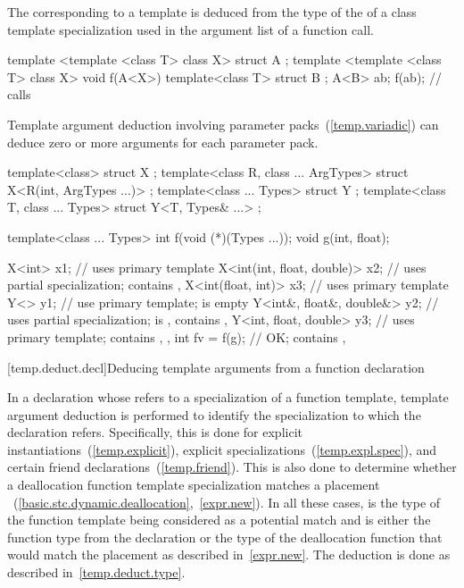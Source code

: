 \pnum
The
corresponding to a template
is deduced from the type of the
of a class template specialization used in the argument list of a function call.
\enterexample

\begin{codeblock}
template <template <class T> class X> struct A { };
template <template <class T> class X> void f(A<X>) { }
template<class T> struct B { };
A<B> ab;
f(ab);              // calls 
\end{codeblock}
\exitexample

\pnum
\enternote Template argument deduction involving parameter
packs~(\ref{temp.variadic}) can deduce zero or more arguments for
each parameter pack. \exitnote\enterexample

\begin{codeblock}
template<class> struct X { };
template<class R, class ... ArgTypes> struct X<R(int, ArgTypes ...)> { };
template<class ... Types> struct Y { };
template<class T, class ... Types> struct Y<T, Types& ...> { };

template<class ... Types> int f(void (*)(Types ...));
void g(int, float);

X<int> x1;                      // uses primary template
X<int(int, float, double)> x2;  // uses partial specialization;  contains , 
X<int(float, int)> x3;          // uses primary template
Y<> y1;                         // use primary template;  is empty
Y<int&, float&, double&> y2;    // uses partial specialization;  is ,  contains , 
Y<int, float, double> y3;       // uses primary template;  contains , , 
int fv = f(g);                  // OK;  contains , 
\end{codeblock}

\exitexample

[temp.deduct.decl]{Deducing template arguments from a function declaration}

\pnum
In a declaration whose  refers to a specialization
of a function template, template argument deduction is performed to identify
the specialization to which the declaration refers. Specifically, this is done
for explicit instantiations~(\ref{temp.explicit}), explicit specializations~(\ref{temp.expl.spec}),
and certain friend declarations~(\ref{temp.friend}). This is also done to
determine whether a deallocation function template specialization matches a placement
~(\ref{basic.stc.dynamic.deallocation},~\ref{expr.new}).
In all these cases,  is the type of the function template being considered
as a potential match and  is either the function type from the
declaration
or the type of the deallocation function that would match the placement
 as described in~\ref{expr.new}. The
deduction is done as described in~\ref{temp.deduct.type}.

